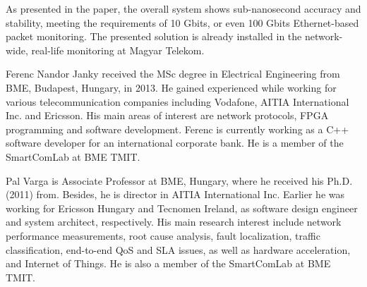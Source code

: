 \documentclass[journal]{IEEEtran}
\begin{document}
As presented in the paper, the overall system shows sub-nanosecond accuracy and stability, meeting the requirements of 10 Gbit\/s, or even 100 Gbit\/s Ethernet-based packet monitoring. The presented solution is already installed in the network-wide, real-life monitoring at Magyar Telekom.





\begin{IEEEbiography}{Ferenc Nandor Janky} 
received the MSc degree in Electrical Engineering from BME, Budapest, Hungary, in 2013.
He gained experienced while working for various telecommunication companies including Vodafone, AITIA International Inc. and Ericsson.
His main areas of interest are network protocols, FPGA programming and software development. 
Ferenc is currently working as a C++ software developer for an international corporate bank. He is a member of the SmartComLab at BME TMIT.
\end{IEEEbiography}


\begin{IEEEbiography}{Pal Varga}
 is Associate Professor at BME, Hungary, where he received his Ph.D. (2011) from. Besides, he is director in AITIA International Inc. Earlier he was working for Ericsson Hungary and Tecnomen Ireland, as software design engineer and system architect, respectively. His main research interest include network performance measurements, root cause analysis, fault localization, traffic classification, end-to-end QoS and SLA issues, as well as hardware acceleration, and Internet of Things. He is also a member of the SmartComLab at BME TMIT.

\end{IEEEbiography}
\end{document}
